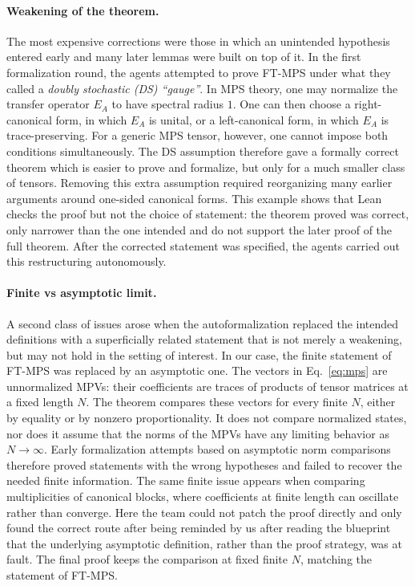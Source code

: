 \documentclass[aps,prl,twocolumn,superscriptaddress,longbibliography,10pt,footinbib]{revtex4-2}
\begin{document}
\paragraph*{Weakening of the theorem.}%
The most expensive corrections were those in which an unintended hypothesis entered early and many later lemmas were built on top of it.
In the first formalization round, the agents attempted to prove FT-MPS under what they called a \textit{doubly stochastic (DS) ``gauge''}. In MPS theory, one may normalize the transfer operator $E_A$ to have spectral radius $1$. One can then choose a right-canonical form, in which $E_A$ is unital, or a left-canonical form, in which $E_A$ is trace-preserving. For a generic MPS tensor, however, one cannot impose both conditions simultaneously. The DS assumption therefore gave a formally correct theorem which is easier to prove and formalize, but only for a much smaller class of tensors. Removing this extra assumption required reorganizing many earlier arguments around one-sided canonical forms.
This example shows that Lean checks the proof but not the choice of statement: the theorem proved was correct, only narrower than the one intended and do not support the later proof of the full theorem.
After the corrected statement was specified, the agents carried out this restructuring autonomously.

\paragraph*{Finite vs asymptotic limit.}%
A second class of issues arose when the autoformalization replaced the intended definitions with a superficially related statement that is not merely a weakening, but may not hold in the setting of interest. In our case, the finite statement of FT-MPS was replaced by an asymptotic one. The vectors in Eq.~\eqref{eq:mps} are unnormalized MPVs: their coefficients are traces of products of tensor matrices at a fixed length $N$. The theorem compares these vectors for every finite $N$, either by equality or by nonzero proportionality. It does not compare normalized states, nor does it assume that the norms of the MPVs have any limiting behavior as $N\to\infty$. Early formalization attempts based on asymptotic norm comparisons therefore proved statements with the wrong hypotheses and failed to recover the needed finite information. The same finite issue appears when comparing multiplicities of canonical blocks, where coefficients at finite length can oscillate rather than converge.
Here the team could not patch the proof directly and only found the correct route after being reminded by us after reading the blueprint that the underlying asymptotic definition, rather than the proof strategy, was at fault.
The final proof keeps the comparison at fixed finite $N$, matching the statement of FT-MPS\@.
\end{document}
